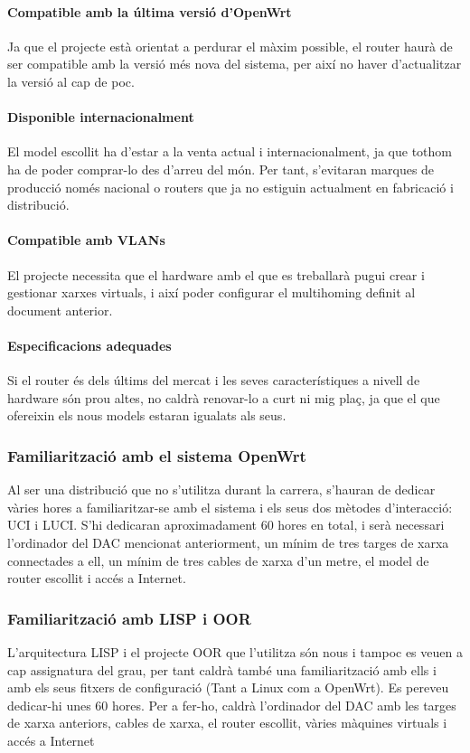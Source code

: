 \documentclass[11pt]{article}
\begin{document}
\paragraph{Compatible amb la última versió d’OpenWrt}
Ja que el projecte està orientat a perdurar el màxim possible, el router haurà de ser compatible amb la versió més nova del sistema, per així no haver d’actualitzar la versió al cap de poc.
\paragraph{Disponible internacionalment}
El model escollit ha d’estar a la venta actual i internacionalment, ja que tothom ha de poder comprar-lo des d’arreu del món. Per tant, s’evitaran marques de producció només nacional o routers que ja no estiguin actualment en fabricació i distribució.
\paragraph{Compatible amb VLANs}
El projecte necessita que el hardware amb el que es treballarà pugui crear i gestionar xarxes virtuals, i així poder configurar el multihoming definit al document anterior.
\paragraph{Especificacions adequades}
Si el router és dels últims del mercat i les seves característiques a nivell de hardware són prou altes, no caldrà renovar-lo a curt ni mig plaç, ja que el que ofereixin els nous models estaran igualats als seus.
\subsubsection{Familiarització amb el sistema OpenWrt}
Al ser una distribució que no s’utilitza durant la carrera, s’hauran de dedicar vàries hores a familiaritzar-se amb el sistema i els seus dos mètodes d’interacció: UCI i LUCI. S’hi dedicaran aproximadament 60 hores en total, i serà necessari l’ordinador del DAC mencionat anteriorment, un mínim de tres targes de xarxa connectades a ell, un mínim de tres cables de xarxa d’un metre, el model de router escollit i accés a Internet.
\subsubsection{Familiarització amb LISP i OOR}
L’arquitectura LISP i el projecte OOR que l’utilitza són nous i tampoc es veuen a cap assignatura del grau, per tant caldrà també una familiarització amb ells i amb els seus fitxers de configuració (Tant a Linux com a OpenWrt). Es pereveu dedicar-hi unes 60 hores. Per a fer-ho, caldrà l’ordinador del DAC amb les targes de xarxa anteriors, cables de xarxa, el router escollit, vàries màquines virtuals i accés a Internet
\end{document}
